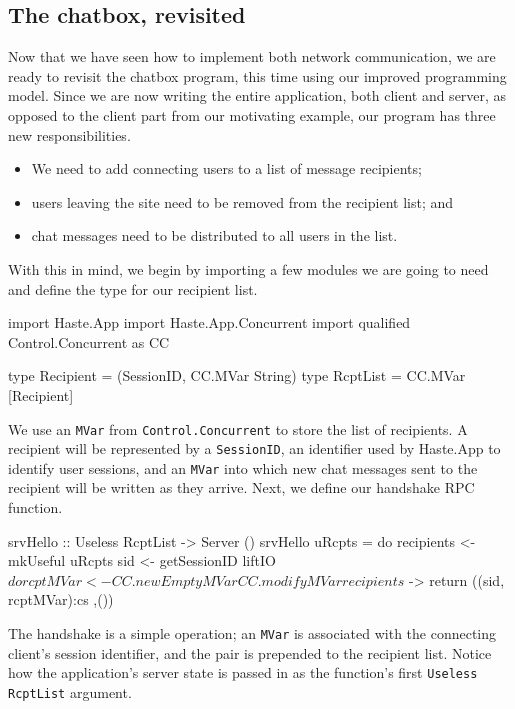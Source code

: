 \documentclass[preprint]{sigplanconf}
\begin{document}
\subsection{The chatbox, revisited}

Now that we have seen how to implement both network communication, we are ready
to revisit the chatbox program, this time using our improved programming model.
Since we are now writing the entire application, both client and server, as
opposed to the client part from our motivating example, our program has three
new responsibilities.

\begin{itemize}
  \item We need to add connecting users to a list of message recipients;
  \item users leaving the site need to be removed from the recipient list; and
  \item chat messages need to be distributed to all users in the list.
\end{itemize}

With this in mind, we begin by importing a few modules we are going to need and
define the type for our recipient list.

\begin{code}
import Haste.App
import Haste.App.Concurrent
import qualified Control.Concurrent as CC

type Recipient = (SessionID, CC.MVar String)
type RcptList = CC.MVar [Recipient]
\end{code}

We use an \lstinline!MVar! from \lstinline!Control.Concurrent! to store the
list of recipients. A recipient will be represented by a \lstinline!SessionID!,
an identifier used by Haste.App to identify user sessions, and an
\lstinline!MVar! into which new chat messages sent to the recipient will be
written as they arrive. Next, we define our handshake RPC function.

\begin{code}
srvHello :: Useless RcptList -> Server ()
srvHello uRcpts = do
  recipients <- mkUseful uRcpts
  sid <- getSessionID
  liftIO $ do
    rcptMVar <- CC.newEmptyMVar
    CC.modifyMVar recipients $ \cs ->
      return ((sid, rcptMVar):cs ,())
\end{code}

The handshake is a simple operation; an \lstinline!MVar! is associated with the
connecting client's session identifier, and the pair is prepended to the
recipient list. Notice how the application's server state is passed in as the
function's first \lstinline!Useless RcptList! argument.
\end{document}
